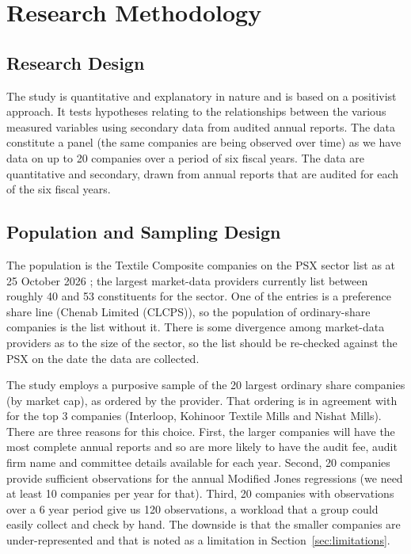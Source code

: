 \chapter{Research Methodology}

\section{Research Design}

The study is quantitative and explanatory in nature and is based on a positivist approach. It tests hypotheses relating to the relationships between the various measured variables using secondary data from audited annual reports. The data constitute a panel (the same companies are being observed over time) as we have data on up to 20 companies over a period of six fiscal years. The data are quantitative and secondary, drawn from annual reports that are audited for each of the six fiscal years.

\section{Population and Sampling Design}
\label{sec:sampling}

The population is the Textile Composite companies on the PSX sector list as at 25 October 2026 \parencite{tickeranalysts2026}; the largest market-data providers currently list between roughly 40 and 53 constituents for the sector. One of the entries is a preference share line (Chenab Limited (CLCPS)), so the population of ordinary-share companies is the list without it. There is some divergence among market-data providers as to the size of the sector, so the list should be re-checked against the PSX on the date the data are collected.

The study employs a purposive sample of the 20 largest ordinary share companies (by market cap), as ordered by the provider. That ordering is in agreement with \textcite{finhisaab2026} for the top 3 companies (Interloop, Kohinoor Textile Mills and Nishat Mills). There are three reasons for this choice. First, the larger companies will have the most complete annual reports and so are more likely to have the audit fee, audit firm name and committee details available for each year. Second, 20 companies provide sufficient observations for the annual Modified Jones regressions (we need at least 10 companies per year for that). Third, 20 companies with observations over a 6 year period give us 120 observations, a workload that a group could easily collect and check by hand. The downside is that the smaller companies are under-represented and that is noted as a limitation in Section~\ref{sec:limitations}.


